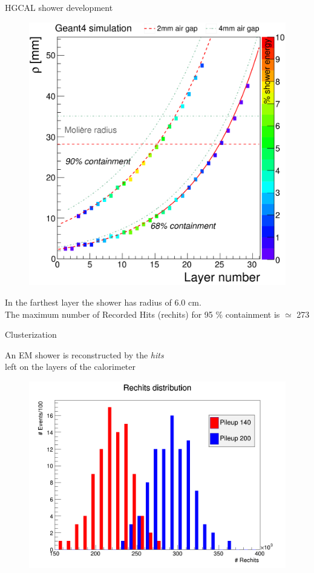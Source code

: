 \documentclass{beamer}
\begin{document}
\begin{frame}{HGCAL shower development}
\begin{center}
\begin{figure}
\includegraphics[scale=2]{images/moliereHgcal.png}
\end{figure}
In the farthest layer the shower has radius of 6.0 cm.\\
\vspace{0.5cm}
The maximum number of Recorded Hits (rechits) for 95 $\%$ containment is $\simeq$ 273
\end{center}
\end{frame}

\begin{frame}{Clusterization}
\begin{center}
An EM shower is reconstructed by the \textit{hits}\\
left on the layers of the calorimeter
\begin{figure}
\includegraphics[scale=0.25]{images/rechitsHisto.png}
\end{figure}
\end{center}
\end{frame}
\end{document}
